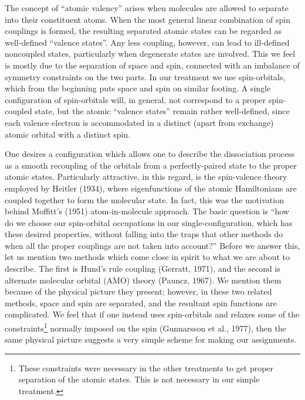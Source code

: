 \documentclass[12pt,letterpaper]{report}
\begin{document}
The concept of ``atomic valency'' arises when molecules are allowed to separate into their constituent atoms. When the most general linear combination of spin couplings is formed, the resulting separated atomic states can be regarded as well-defined ``valence states''. Any less coupling, however, can lead to ill-defined noncoupled states, particularly when degenerate states are involved. This we feel is mostly due to the separation of space and spin, connected with an imbalance of symmetry constraints on the two parts. In our treatment we use spin-orbitals, which from the beginning puts space and spin on similar footing. A single configuration of spin-orbitals will, in general, not correspond to a proper spin-coupled state, but the atomic ``valence states'' remain rather well-defined, since each valence electron is accommodated in a distinct (apart from exchange) atomic orbital with a distinct spin.

One desires a configuration which allows one to describe the dissociation process as a smooth recoupling of the orbitals from a perfectly-paired state to the proper atomic states. Particularly attractive, in this regard, is the spin-valence theory employed by Heitler (1934), where eigenfunctions of the atomic Hamiltonians are coupled together to form the molecular state. In fact, this was the motivation behind Moffitt's (1951) atom-in-molecule approach. The basic question is ``how do we choose our spin-orbital occupations in our single-configuration, which has these desired properties, without falling into the traps that other methods do when all the proper couplings are not taken into account?'' Before we answer this, let us mention two methods which come close in spirit to what we are about to describe. The first is Hund's rule coupling (Gerratt, 1971), and the second is alternate molecular orbital (AMO) theory (Pauncz, 1967). We mention them because of the physical picture they present; however, in these two related methods, space and spin are separated, and the resultant spin functions are complicated. We feel that if one instead uses spin-orbitals and relaxes some of the constraints\footnote{These constraints were necessary in the other treatments to get proper separation of the atomic states. This is not necessary in our simple treatment.} normally imposed on the spin (Gunnarsson et al., 1977), then the same physical picture suggests a very simple scheme for making our assignments.
\end{document}
